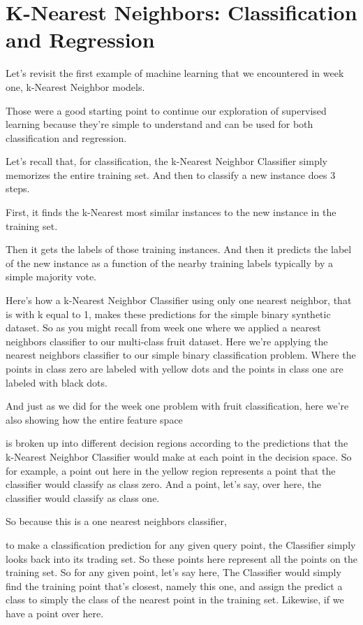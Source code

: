 \section{K-Nearest Neighbors: Classification and Regression}

\begin{multicols}{2}

Let's revisit the first example of machine learning that we encountered in week one, k-Nearest Neighbor models. 

Those were a good starting point to continue our exploration of supervised learning because they're simple to understand and can be used for both classification and regression. 

Let's recall that, for classification, the k-Nearest Neighbor Classifier simply memorizes the entire training set. And then to classify a new instance does 3 steps. 

First, it finds the k-Nearest most similar instances to the new instance in the training set. 

Then it gets the labels of those training instances. And then it predicts the label of the new instance as a function of the nearby training labels typically by a simple majority vote. 

Here's how a k-Nearest Neighbor Classifier using only one nearest neighbor, that is with k equal to 1, makes these predictions for the simple binary synthetic dataset. So as you might recall from week one where we applied a nearest neighbors classifier to our multi-class fruit dataset. Here we're applying the nearest neighbors classifier to our simple binary classification problem. Where the points in class zero are labeled with yellow dots and the points in class one are labeled with black dots. 

And just as we did for the week one problem with fruit classification, here we're also showing how the entire feature space 

is broken up into different decision regions according to the predictions that the k-Nearest Neighbor Classifier would make at each point in the decision space. So for example, a point out here in the yellow region represents a point that the classifier would classify as class zero. And a point, let's say, over here, the classifier would classify as class one. 

So because this is a one nearest neighbors classifier, 

to make a classification prediction for any given query point, the Classifier simply looks back into its trading set. So these points here represent all the points on the training set. So for any given point, let's say here, The Classifier would simply find the training point that's closest, namely this one, and assign the predict a class to simply the class of the nearest point in the training set. Likewise, if we have a point over here. 


\end{multicols}
